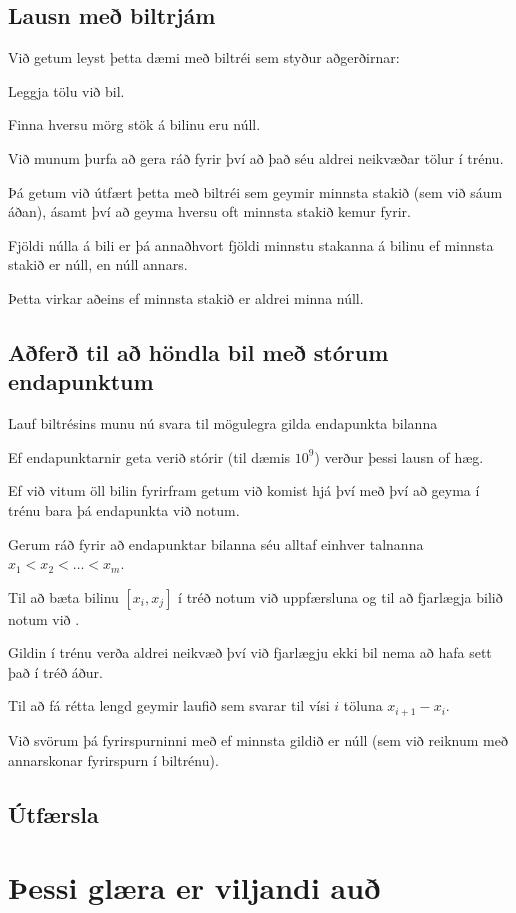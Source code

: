 \subsection{Lausn með biltrjám}
{
    {
        \item<1-> Við getum leyst þetta dæmi með biltréi sem styður aðgerðirnar:
        {
            \item<2-> Leggja tölu við bil.
            \item<3-> Finna hversu mörg stök á bilinu eru núll.
        }
        \item<4-> Við munum þurfa að gera ráð fyrir því að það séu aldrei neikvæðar tölur í trénu.
        \item<5-> Þá getum við útfært þetta með biltréi sem geymir minnsta stakið (sem við sáum áðan),
                    ásamt því að geyma hversu oft minnsta stakið kemur fyrir.
        \item<6-> Fjöldi núlla á bili er þá annaðhvort fjöldi minnstu stakanna á bilinu ef minnsta stakið er núll, en núll annars.
        \item<7-> Þetta virkar aðeins ef minnsta stakið er aldrei minna núll.
    }
}

\subsection{Aðferð til að höndla bil með stórum endapunktum}
{
    {
        \item<1-> Lauf biltrésins munu nú svara til mögulegra gilda endapunkta bilanna
        \item<2-> Ef endapunktarnir geta verið stórir (til dæmis $10^9$) verður þessi lausn of hæg.
        \item<3-> Ef við vitum öll bilin fyrirfram getum við komist hjá því með því að geyma í trénu bara þá endapunkta við notum.
        \item<4-> Gerum ráð fyrir að endapunktar bilanna séu alltaf einhver talnanna $x_1 < x_2 < \dots < x_m$.
        \item<5-> Til að bæta bilinu $[x_i, x_j]$ í tréð notum við uppfærsluna 
                    og til að fjarlægja bilið notum við .
        \item<6-> Gildin í trénu verða aldrei neikvæð því við fjarlægju ekki bil nema að hafa sett það í tréð áður.
        \item<7-> Til að fá rétta lengd geymir laufið sem svarar til vísi $i$ töluna $x_{i + 1} - x_i$.
        \item<8-> Við svörum þá fyrirspurninni með  ef minnsta gildið er núll (sem við reiknum með annarskonar fyrirspurn í biltrénu).
    }
}

\subsection{Útfærsla}
{
}

{
}

{
}

\section{Þessi glæra er viljandi auð}
{
}


